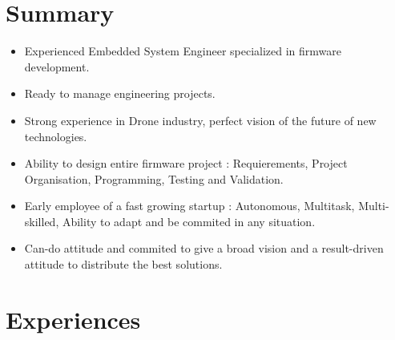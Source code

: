 \documentclass[a4paper]{friggeri-cv} %
\begin{document}
\section{Summary}
\begin{itemize}
\item Experienced Embedded System Engineer specialized in firmware development.
\item Ready to manage engineering projects.
\item Strong experience in Drone industry, perfect vision of the future of new technologies. 
\item Ability to design entire firmware project : Requierements, Project Organisation, Programming, Testing and Validation.
\item Early employee of a fast growing startup : Autonomous, Multitask, Multi-skilled, Ability to adapt and be commited in any situation.
\item Can-do attitude and commited to give a broad vision and a result-driven attitude to distribute the best solutions.
\end{itemize}



\section{Experiences}
\end{document}

